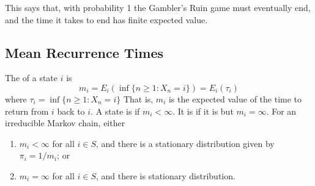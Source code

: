 \documentclass[11pt]{article}
\begin{document}
   \remark This says that, with probability 1 the Gambler's Ruin game must eventually end, and the time it takes to end has finite expected value.
    
    \subsection{Mean Recurrence Times}
     The  of a state $i$ is
    $$m_i = E_i(\inf\{n \geq 1: X_n = i\}) = E_i(\tau_i)$$
    where $\tau_i = \inf\{n \geq 1: X_n = i\}$
    \remark
    That is, $m_i$ is the expected value of the time to return from $i$ back to $i$.
    A state is  if $m_i < \infty$. It is  if it is  but $m_i = \infty$.
     For an irreducible Markov chain, either
    \begin{enumerate}
    	\item $m_i < \infty$ for all $i \in S$, and there is a  stationary distribution given by $\pi_i = 1/m_i$; or
    	\item $m_i = \infty$ for all $i \in S$, and there is  stationary distribution.
    \end{enumerate}
\end{document}
